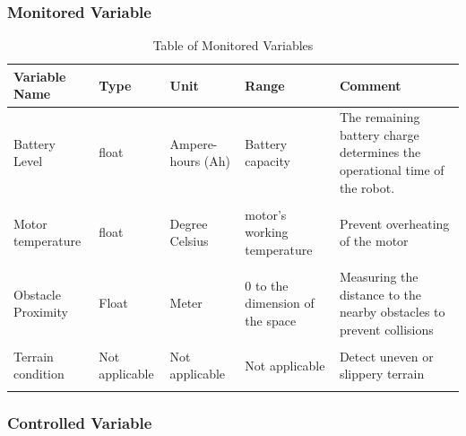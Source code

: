 \documentclass[12pt]{article}
\begin{document}
\subsubsection{Monitored Variable}

\begin{table}[H]
\caption{Table of Monitored Variables} 
\begin{tabularx}{\textwidth}{XXXXX}
\toprule
\textbf{Variable Name} & \textbf{Type} & \textbf{Unit} & \textbf{Range} & \textbf{Comment} \\
\midrule
Battery Level & float & Ampere-hours (Ah) & Battery capacity & The remaining battery charge determines the operational time of the robot.\\\\
Motor temperature & float & Degree Celsius & motor's working temperature & Prevent overheating of the motor \\\\
Obstacle Proximity & Float & Meter & 0 to the dimension of the space & Measuring the distance to the nearby obstacles to prevent collisions \\\\
Terrain condition& Not applicable & Not applicable & Not applicable & Detect uneven or slippery terrain \\\\

\bottomrule
\end{tabularx}
\end{table}





\subsubsection{Controlled Variable}
\end{document}
